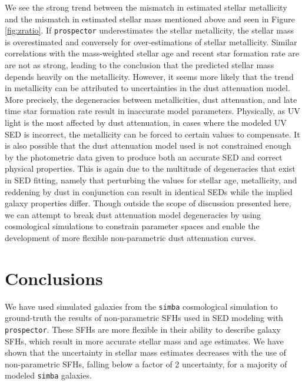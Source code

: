 \documentclass[twocolumn]{aastex62}
\begin{document}
We see the strong trend between the mismatch in estimated stellar metallicity and the mismatch in estimated stellar mass mentioned above and seen in Figure \ref{fig:zratio}. If \texttt{prospector} underestimates the stellar metallicity, the stellar mass is overestimated and conversely for over-estimations of stellar metallicity. Similar correlations with the mass-weighted stellar age and recent star formation rate are are not as strong, leading to the conclusion that the predicted stellar mass depends heavily on the metallicity. However, it seems more likely that the trend in metallicity can be attributed to uncertainties in the dust attenuation model. More precisely, the degeneracies between metallicities, dust attenuation, and late time star formation rate result in inaccurate model parameters. Physically, as UV light is the most affected by dust attenuation, in cases where the modeled UV SED is incorrect, the metallicity can be forced to certain values to compensate. It is also possible that the dust attenuation model used is not constrained enough by the photometric data given to produce both an accurate SED and correct physical properties. This is again due to the multitude of degeneracies that exist in SED fitting, namely that perturbing the values for stellar age, metallicity, and reddening by dust in conjunction can result in identical SEDs while the implied galaxy properties differ. Though outside the scope of discussion presented here, we can attempt to break dust attenuation model degeneracies by using cosmological simulations to constrain parameter spaces and enable the development of more flexible non-parametric dust attenuation curves. 



\section{Conclusions}

We have used simulated galaxies from the \texttt{simba} cosmological simulation to ground-truth the results of non-parametric SFHs used in SED modeling with \texttt{prospector}. These SFHs are more flexible in their ability to describe galaxy SFHs, which result in more accurate stellar mass and age estimates. We have shown that the uncertainty in stellar mass estimates decreases with the use of non-parametric SFHs, falling below a factor of 2 uncertainty, for a majority of modeled \texttt{simba} galaxies. 
\end{document}
